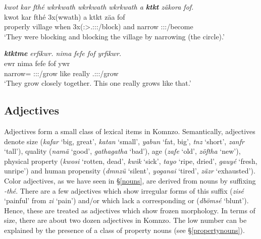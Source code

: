\begin{exe}
	\ex \emph{kwot kar fthé wkrkwath wkrkwath wkrkwath a \textbf{ktkt} zäkora fof.}\\
	\gll kwot kar fthé 3x(wwath) a {ktkt} zäa fof\\
	properly village when 3x(\Stpl:\Sbj>\Tsg.\F:\Obj:\Pst:\Ipfv/block) and narrow \Stsg:\Sbj:\Pst:\Pfv/become \Emph{}\\
	\trans `They were blocking and blocking the village by narrowing (the circle).'\\
	\label{ex033}
\end{exe}
\begin{exe}
	\ex \emph{\textbf{ktktme} erfikwr. nima fefe fof yrfikwr.}\\
	 ewr nima fefe fof ywr\\
	narrow=\Ins{} \Stpl:\Sbj:\Nonpast:\Ipfv/grow like really \Emph{} \Tsg.\Masc:\Sbj:\Nonpast:\Ipfv/grow\\
	\trans `They grow closely together. This one really grows like that.'\\
	\label{ex034}
\end{exe}

\subsection{Adjectives} \label{adjectives}

Adjectives form a small class of lexical items in Komnzo. Semantically, adjectives denote size (\emph{kafar} `big, great', \emph{katan} `small', \emph{yabun} `fat, big', \emph{tnz} `short', \emph{zanfr} `tall'), quality (\emph{namä} `good', \emph{gathagatha} `bad'), age (\emph{zafe} `old', \emph{zöftha} `new'), physical property (\emph{kwosi} `rotten, dead', \emph{kwik} `sick', \emph{tayo} `ripe, dried', \emph{gauyé} `fresh, unripe') and human propensity (\emph{dmnzü} `silent', \emph{yoganai} `tired', \emph{zäzr} `exhausted'). Color adjectives, as we have seen in \S{}\ref{nouns}, are derived from nouns by suffixing \emph{-thé}. There are a few adjectives which show irregular forms of this suffix (\emph{zisé} `painful' from \emph{zi} `pain') and/or which lack a corresponding  or  (\emph{dbömsé} `blunt'). Hence, these are treated as adjectives which show frozen morphology. In terms of size, there are about two dozen adjectives in Komnzo. The low number can be explained by the presence of a class of property nouns (see \S{}\ref{propertynouns}).%

